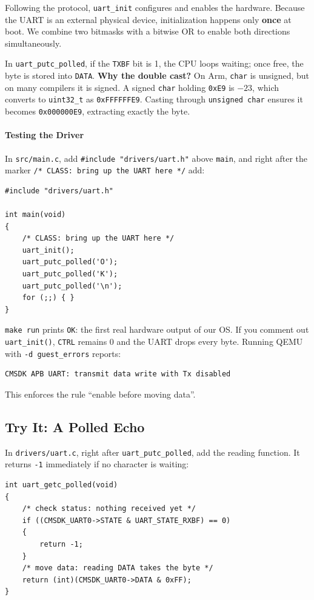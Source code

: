 Following the protocol, \texttt{uart\_init} configures and enables the hardware. Because the UART is an external physical device, initialization happens only \textbf{once} at boot. We combine two bitmasks with a bitwise OR to enable both directions simultaneously. 

In \texttt{uart\_putc\_polled}, if the \texttt{TXBF} bit is 1, the CPU loops waiting; once free, the byte is stored into \texttt{DATA}. 
\textbf{Why the double cast?} On Arm, \texttt{char} is unsigned, but on many compilers it is signed. A signed \texttt{char} holding \texttt{0xE9} is $-23$, which converts to \texttt{uint32\_t} as \texttt{0xFFFFFFE9}. Casting through \texttt{unsigned char} ensures it becomes \texttt{0x000000E9}, extracting exactly the byte.

\paragraph{Testing the Driver}
In \texttt{src/main.c}, add \texttt{\#include "drivers/uart.h"} above \texttt{main}, and right after the marker \texttt{/* CLASS: bring up the UART here */} add:

\begin{lstlisting}
#include "drivers/uart.h"

int main(void)
{
    /* CLASS: bring up the UART here */
    uart_init();
    uart_putc_polled('O');
    uart_putc_polled('K');
    uart_putc_polled('\n');
    for (;;) { }
}
\end{lstlisting}

\texttt{make run} prints \texttt{OK}: the first real hardware output of our OS. 
If you comment out \texttt{uart\_init()}, \texttt{CTRL} remains 0 and the UART drops every byte. Running QEMU with \texttt{-d guest\_errors} reports:
\begin{lstlisting}[language=bash]
CMSDK APB UART: transmit data write with Tx disabled
\end{lstlisting}
This enforces the rule ``enable before moving data''.

\subsection{Try It: A Polled Echo}
In \texttt{drivers/uart.c}, right after \texttt{uart\_putc\_polled}, add the reading function. It returns \texttt{-1} immediately if no character is waiting:

\begin{lstlisting}
int uart_getc_polled(void)
{
    /* check status: nothing received yet */
    if ((CMSDK_UART0->STATE & UART_STATE_RXBF) == 0)
    {
        return -1;
    }
    /* move data: reading DATA takes the byte */
    return (int)(CMSDK_UART0->DATA & 0xFF);
}
\end{lstlisting}


